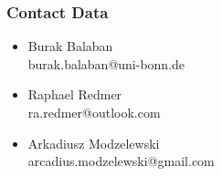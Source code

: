 \begin{frame}
    \frametitle{Contact Data}
    \begin{itemize}
        \item Burak Balaban\\
        \quad \quad burak.balaban@uni-bonn.de
        \smallbreak
        \item Raphael Redmer\\
        \quad \quad ra.redmer@outlook.com
        \smallbreak
        \item Arkadiusz Modzelewski\\
        \quad \quad arcadius.modzelewski@gmail.com
    \end{itemize}
\end{frame}
    

